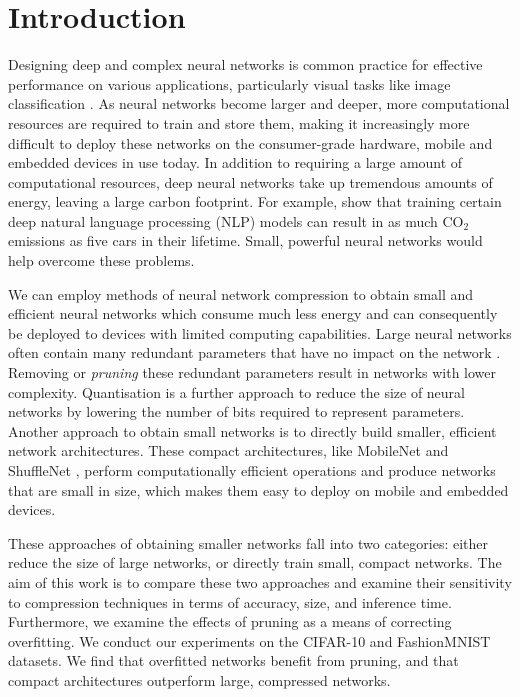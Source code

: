\documentclass[conference]{IEEEtran}
\begin{document}
\section{Introduction}

Designing deep and complex neural networks is common practice for effective performance on various applications, particularly visual tasks like image classification \cite{liu2017surveydeep}. As neural networks become larger and deeper, more computational resources are required to train and store them, making it increasingly more difficult to deploy these networks on the consumer-grade hardware, mobile and embedded devices in use today. In addition to requiring a large amount of computational resources, deep neural networks take up tremendous amounts of energy, leaving a large carbon footprint. For example, \cite{strubell1906energy} show that training certain deep natural language processing (NLP) models can result in as much CO$_2$ emissions as five cars in their lifetime. Small, powerful neural networks would help overcome these problems.

We can employ methods of neural network compression to obtain small and efficient neural networks which consume much less energy and can consequently be deployed to devices with limited computing capabilities. Large neural networks often contain many redundant parameters that have no impact on the network \cite{denil2013predicting}. Removing or \emph{pruning} these redundant parameters result in networks with lower complexity. Quantisation is a further approach to reduce the size of neural networks by lowering the number of bits required to represent parameters. Another approach to obtain small networks is to directly build smaller, efficient network architectures. These compact architectures, like MobileNet \cite{howard2017mobilenets} and ShuffleNet \cite{zhang2018shufflenet}, perform computationally efficient operations and produce networks that are small in size, which makes them easy to deploy on mobile and embedded devices.

These approaches of obtaining smaller networks fall into two categories: either reduce the size of large networks, or directly train small, compact networks. The aim of this work is to compare these two approaches and examine their sensitivity to compression techniques in terms of accuracy, size, and inference time. Furthermore, we examine the effects of pruning as a means of correcting overfitting. We conduct our experiments on the CIFAR-10 \cite{krizhevsky2014cifar} and FashionMNIST \cite{xiao2017fashion} datasets. We find that overfitted networks benefit from pruning, and that compact architectures outperform large, compressed networks.
\end{document}
